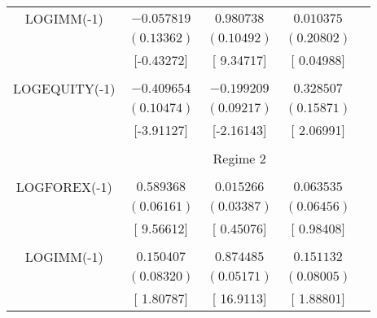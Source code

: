 \begin{tabular}{lrrrr}
\multicolumn{1}{c}{LOGIMM(-1)}&\multicolumn{1}{c}{$-0.057819$}&\multicolumn{1}{c}{$0.980738$}&\multicolumn{1}{c}{$0.010375$}&\multicolumn{1}{c}{}\\
\multicolumn{1}{c}{}&\multicolumn{1}{c}{$(0.13362)$}&\multicolumn{1}{c}{$(0.10492)$}&\multicolumn{1}{c}{$(0.20802)$}&\multicolumn{1}{c}{}\\
\multicolumn{1}{c}{}&\multicolumn{1}{c}{[-0.43272]}&\multicolumn{1}{c}{[ 9.34717]}&\multicolumn{1}{c}{[ 0.04988]}&\multicolumn{1}{c}{}\\
\multicolumn{1}{c}{}&\multicolumn{1}{c}{}&\multicolumn{1}{c}{}&\multicolumn{1}{c}{}&\multicolumn{1}{c}{}\\
\multicolumn{1}{c}{LOGEQUITY(-1)}&\multicolumn{1}{c}{$-0.409654$}&\multicolumn{1}{c}{$-0.199209$}&\multicolumn{1}{c}{$0.328507$}&\multicolumn{1}{c}{}\\
\multicolumn{1}{c}{}&\multicolumn{1}{c}{$(0.10474)$}&\multicolumn{1}{c}{$(0.09217)$}&\multicolumn{1}{c}{$(0.15871)$}&\multicolumn{1}{c}{}\\
\multicolumn{1}{c}{}&\multicolumn{1}{c}{[-3.91127]}&\multicolumn{1}{c}{[-2.16143]}&\multicolumn{1}{c}{[ 2.06991]}&\multicolumn{1}{c}{}\\
[4.5pt] \hline \\ [-4.5pt]
\multicolumn{1}{c}{}&\multicolumn{3}{c}{Regime 2}&\multicolumn{1}{c}{}\\
[4.5pt] \hline \\ [-4.5pt]
\multicolumn{1}{c}{LOGFOREX(-1)}&\multicolumn{1}{c}{$0.589368$}&\multicolumn{1}{c}{$0.015266$}&\multicolumn{1}{c}{$0.063535$}&\multicolumn{1}{c}{}\\
\multicolumn{1}{c}{}&\multicolumn{1}{c}{$(0.06161)$}&\multicolumn{1}{c}{$(0.03387)$}&\multicolumn{1}{c}{$(0.06456)$}&\multicolumn{1}{c}{}\\
\multicolumn{1}{c}{}&\multicolumn{1}{c}{[ 9.56612]}&\multicolumn{1}{c}{[ 0.45076]}&\multicolumn{1}{c}{[ 0.98408]}&\multicolumn{1}{c}{}\\
\multicolumn{1}{c}{}&\multicolumn{1}{c}{}&\multicolumn{1}{c}{}&\multicolumn{1}{c}{}&\multicolumn{1}{c}{}\\
\multicolumn{1}{c}{LOGIMM(-1)}&\multicolumn{1}{c}{$0.150407$}&\multicolumn{1}{c}{$0.874485$}&\multicolumn{1}{c}{$0.151132$}&\multicolumn{1}{c}{}\\
\multicolumn{1}{c}{}&\multicolumn{1}{c}{$(0.08320)$}&\multicolumn{1}{c}{$(0.05171)$}&\multicolumn{1}{c}{$(0.08005)$}&\multicolumn{1}{c}{}\\
\multicolumn{1}{c}{}&\multicolumn{1}{c}{[ 1.80787]}&\multicolumn{1}{c}{[ 16.9113]}&\multicolumn{1}{c}{[ 1.88801]}&\multicolumn{1}{c}{}\\

\end{tabular}
